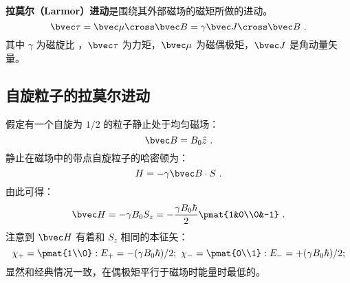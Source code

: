 \textbf{拉莫尔（Larmor）进动}是围绕其外部磁场的磁矩所做的进动。
\begin{equation}
\bvec \tau = \bvec\mu\cross\bvec B=\gamma\bvec J\cross \bvec B~.
\end{equation}
其中 $\gamma$ 为磁旋比 ，$\bvec\tau$ 为力矩，$\bvec \mu$ 为磁偶极矩，$\bvec J$ 是角动量矢量。

\subsection{自旋粒子的拉莫尔进动}

假定有一个自旋为 $1/2$ 的粒子静止处于均匀磁场：
\begin{equation}
\bvec B =B_0\hat{z}~.
\end{equation}
静止在磁场中的带点自旋粒子的哈密顿为：
\begin{equation}
H = -\gamma\bvec B\cdot S~.
\end{equation}
由此可得：
\begin{equation}
\bvec H = -\gamma B_0S_z=-\frac{\gamma B_0\hbar}{2}\pmat{1&0\\0&-1}~.
\end{equation}
注意到 $\bvec H$ 有着和 $S_z$ 相同的本征矢：
\begin{equation}
\chi_+ = \pmat{1\\0}:E_+=-(\gamma B_0\hbar)/2; \ \chi_- = \pmat{0\\1}:E_-=+(\gamma B_0\hbar)/2; 
\end{equation}
显然和经典情况一致，在偶极矩平行于磁场时能量时最低的。

